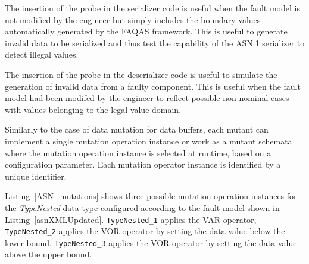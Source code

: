 The insertion of the probe in the serializer code is useful when the fault model is not modified by the engineer but simply includes the boundary values automatically generated by the FAQAS framework. 
This is useful to generate invalid data to be serialized and thus test the capability of the ASN.1 serializer to detect illegal values.

The insertion of the probe in the deserializer code is useful to simulate the generation of invalid data from a faulty component. This is useful when the fault model had been modifed by the engineer to reflect possible non-nominal cases with values belonging to the legal value domain.


Similarly to the case of data mutation for data buffers, each mutant can implement a single mutation operation instance or work as a mutant schemata where the mutation operation instance is selected at runtime, based on a configuration parameter. Each mutation operator instance is identified by a unique identifier. 







Listing~\ref{ASN_mutations} shows three possible mutation operation instances for the \emph{TypeNested} data type configured according to the fault model shown in Listing~\ref{asnXMLUpdated}.
\texttt{TypeNested\_1} applies the VAR operator,
 \texttt{TypeNested\_2} applies the VOR operator by setting the data value below the lower bound.
 \texttt{TypeNested\_3} applies the VOR operator by setting the data value above the upper bound.



